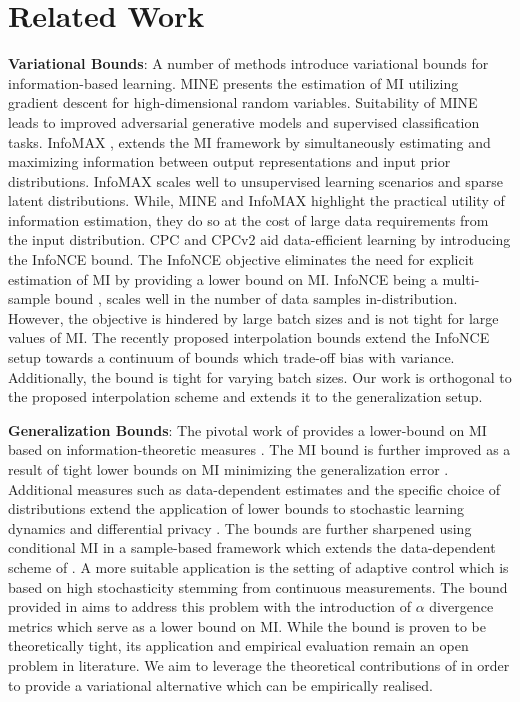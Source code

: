\documentclass{article}
\begin{document}
\section{Related Work}
\textbf{Variational Bounds}: A number of methods \cite{variational,mine,infomax,cpc,cpcv2} introduce variational bounds for information-based learning. MINE \cite{mine} presents the estimation of MI utilizing gradient descent for high-dimensional random variables. Suitability of MINE leads to improved adversarial generative models and supervised classification tasks. InfoMAX \cite{infomax}, extends the MI framework by simultaneously estimating and maximizing information between output representations and input prior distributions. InfoMAX scales well to unsupervised learning scenarios and sparse latent distributions. While, MINE and InfoMAX highlight the practical utility of information estimation, they do so at the cost of large data requirements from the input distribution. CPC \cite{cpc} and CPCv2 \cite{cpcv2} aid data-efficient learning by introducing the InfoNCE bound. The InfoNCE objective eliminates the need for explicit estimation of MI by providing a lower bound on MI. InfoNCE being a multi-sample bound \cite{variational}, scales well in the number of data samples in-distribution. However, the objective is hindered by large batch sizes and is not tight for large values of MI. The recently proposed interpolation bounds \cite{variational} extend the InfoNCE setup towards a continuum of bounds which trade-off bias with variance. Additionally, the bound is tight for varying batch sizes. Our work is orthogonal to the proposed interpolation scheme and extends it to the generalization setup.  

\textbf{Generalization Bounds}: The pivotal work of \cite{russo} provides a lower-bound on MI based on information-theoretic measures \cite{dv,book}. The MI bound \cite{overfit} is further improved as a result of tight lower bounds on MI minimizing the generalization error \cite{xu,bu}. Additional measures such as data-dependent estimates \cite{negrea} and the specific choice of distributions \cite{kuzborskij} extend the application of lower bounds to stochastic learning dynamics \cite{bu,sgld} and differential privacy \cite{russo}. The bounds are further sharpened using conditional MI \cite{haghifam} in a sample-based framework \cite{steinke} which extends the data-dependent scheme of \cite{negrea}. A more suitable application is the setting of adaptive control \cite{control} which is based on high stochasticity stemming from continuous measurements. The bound provided in \cite{control} aims to address this problem with the introduction of $\alpha$ divergence metrics \cite{measures} which serve as a lower bound on MI. While the bound is proven to be theoretically tight, its application and empirical evaluation remain an open problem in literature. We aim to leverage the theoretical contributions of \cite{control} in order to provide a variational alternative which can be empirically realised.
\end{document}
